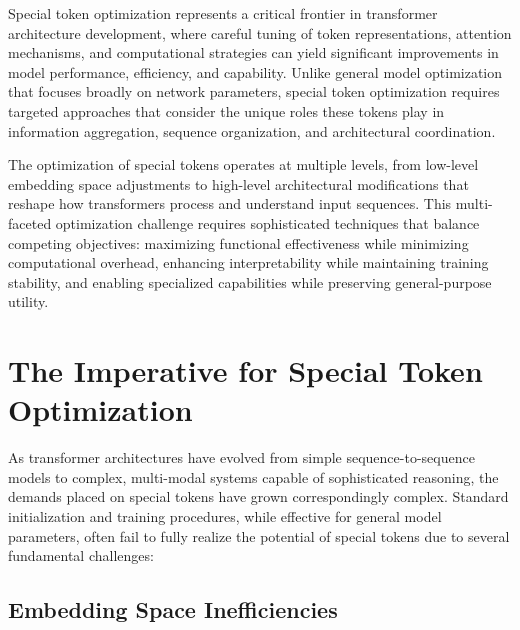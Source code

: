 
Special token optimization represents a critical frontier in transformer architecture development, where careful tuning of token representations, attention mechanisms, and computational strategies can yield significant improvements in model performance, efficiency, and capability. Unlike general model optimization that focuses broadly on network parameters, special token optimization requires targeted approaches that consider the unique roles these tokens play in information aggregation, sequence organization, and architectural coordination.
\begin{comment}
Feedback: This is a strong opening. To make it even more compelling, you could frame it as moving from "design" to "refinement." For example: "Having learned how to design and implement custom special tokens, we now turn to the art of perfecting them. This chapter is about optimization: the process of taking a functional special token and making it faster, more effective, and more efficient. It's the difference between a rough prototype and a production-ready component."
\end{comment}

The optimization of special tokens operates at multiple levels, from low-level embedding space adjustments to high-level architectural modifications that reshape how transformers process and understand input sequences. This multi-faceted optimization challenge requires sophisticated techniques that balance competing objectives: maximizing functional effectiveness while minimizing computational overhead, enhancing interpretability while maintaining training stability, and enabling specialized capabilities while preserving general-purpose utility.

\section{The Imperative for Special Token Optimization}

As transformer architectures have evolved from simple sequence-to-sequence models to complex, multi-modal systems capable of sophisticated reasoning, the demands placed on special tokens have grown correspondingly complex. Standard initialization and training procedures, while effective for general model parameters, often fail to fully realize the potential of special tokens due to several fundamental challenges:

\subsection{Embedding Space Inefficiencies}

